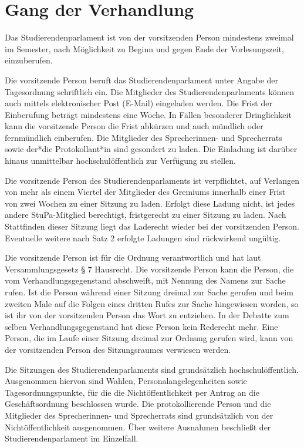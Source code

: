\documentclass[10pt,a4paper]{scrartcl}
\begin{document}
\section{Gang der Verhandlung}\label{gang-der-verhandlung}

\begin{contract}


\label{allgemeines-1}

  Das Studierendenparlament ist von der vorsitzenden Person mindestens
  zweimal im Semester, nach Möglichkeit zu Beginn und gegen Ende der
  Vorlesungszeit, einzuberufen.

  Die vorsitzende Person beruft das Studierendenparlament unter Angabe
  der Tagesordnung schriftlich ein. Die Mitglieder des Studierendenparlaments
  können auch mittels elektronischer Post (E-Mail) eingeladen
  werden. Die Frist der Einberufung beträgt mindestens eine Woche. In
  Fällen besonderer Dringlichkeit kann die vorsitzende Person die Frist
  abkürzen und auch mündlich oder fernmündlich einberufen. Die
  Mitglieder des Sprecherinnen- und Sprecherrats sowie der*die
  Protokollant*in sind gesondert zu laden. Die Einladung ist darüber
  hinaus unmittelbar hochschulöffentlich zur Verfügung zu stellen.

  Die vorsitzende Person des Studierendenparlaments ist verpflichtet,
  auf Verlangen von mehr als einem Viertel der Mitglieder des Gremiums
  innerhalb einer Frist von zwei Wochen zu einer Sitzung zu laden.
  Erfolgt diese Ladung nicht, ist jedes andere StuPa-Mitglied
  berechtigt, fristgerecht zu einer Sitzung zu laden. Nach Stattfinden
  dieser Sitzung liegt das Laderecht wieder bei der vorsitzenden Person.
  Eventuelle weitere nach Satz 2 erfolgte Ladungen sind rückwirkend
  ungültig.

  Die vorsitzende Person ist für die Ordnung verantwortlich und hat laut
  Versammlungsgesetz § 7 Hausrecht. Die vorsitzende Person kann die
  Person, die vom Verhandlungsgegenstand abschweift, mit Nennung des
  Namens zur Sache rufen. Ist die Person während einer Sitzung dreimal
  zur Sache gerufen und beim zweiten Male auf die Folgen eines dritten
  Rufes zur Sache hingewiesen worden, so ist ihr von der vorsitzenden
  Person das Wort zu entziehen. In der Debatte zum selben
  Verhandlungsgegenstand hat diese Person kein Rederecht mehr. Eine
  Person, die im Laufe einer Sitzung dreimal zur Ordnung gerufen wird,
  kann von der vorsitzenden Person des Sitzungsraumes verwiesen werden.

  Die Sitzungen des Studierendenparlaments sind grundsätzlich
  hochschulöffentlich. Ausgenommen hiervon sind Wahlen,
  Personalangelegenheiten sowie Tagesordnungspunkte, für die die
  Nichtöffentlichkeit per Antrag an die Geschäftsordnung beschlossen
  wurde. Die protokollierende Person und die Mitglieder des
  Sprecherinnen- und Sprecherrats sind grundsätzlich von der
  Nichtöffentlichkeit ausgenommen. Über weitere Ausnahmen beschließt der
  Studierendenparlament im Einzelfall.


\end{contract}
\end{document}
